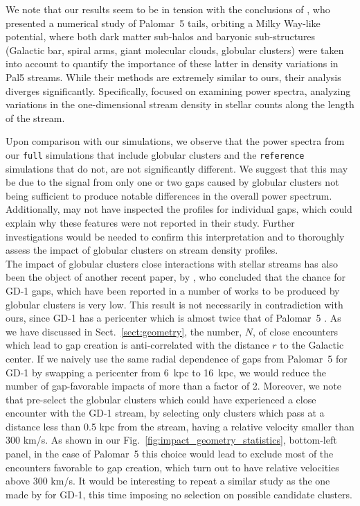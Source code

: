 \documentclass{aa}
\begin{document}
  We note that our results seem to be in tension with the conclusions of \citet{2019MNRAS.484.2009B}, who presented a numerical study of Palomar~5 tails, orbiting a Milky Way-like potential, where both dark matter sub-halos and baryonic sub-structures (Galactic bar, spiral arms, giant molecular clouds, globular clusters) were taken into account to quantify the importance of these latter in density variations in Pal5 streams. While their methods are extremely similar to ours, their analysis diverges significantly. Specifically, \citet{2019MNRAS.484.2009B} focused on examining power spectra, analyzing variations in the one-dimensional stream density in stellar counts along the length of the stream. 

  Upon comparison with our simulations, we observe that the power spectra from our \texttt{full} simulations that include globular clusters and the \texttt{reference} simulations that do not, are not significantly different. We suggest that this may be due to the signal from only one or two gaps caused by globular clusters not being sufficient to produce notable differences in the overall power spectrum. Additionally, \citet{2019MNRAS.484.2009B} may not have inspected the profiles for individual gaps, which could explain why these features were not reported in their study. Further investigations would be needed to confirm this interpretation and to thoroughly assess the impact of globular clusters on stream density profiles. \\

  The impact of globular clusters close interactions with stellar streams has also been the object of another recent paper, by \citet{2022ApJ...941..129D}, who concluded that the chance for GD-1 gaps, which have been reported in a number of works \citep[see, for example, ][]{2019ApJ...880...38B,2018MNRAS.477.1893D,2020AAS...23533607D} to be produced by globular clusters is very low. This result is not necessarily in contradiction with ours, since GD-1 has a pericenter which is almost twice that of Palomar~5 \citep[see, for example][]{2019MNRAS.486.2995M}. As we have discussed in Sect.~\ref{sect:geometry}, the number, $N$, of close encounters which lead to gap creation is anti-correlated with the distance $r$ to the Galactic center. If we naively use the same radial dependence of gaps from Palomar~5 for GD-1 by swapping a pericenter from 6~kpc to 16~kpc, we would reduce the number of gap-favorable impacts of more than a factor of 2. Moreover, we note that \citet{2022ApJ...941..129D} pre-select the globular clusters which could have experienced a close encounter with the GD-1 stream, by selecting only clusters which pass at a distance less than 0.5 kpc from the stream, having a relative velocity smaller than  300 km/s. As shown in our Fig.~\ref{fig:impact_geometry_statistics}, bottom-left panel, in the case of Palomar~5 this choice would lead to exclude most of the encounters favorable to gap creation, which turn out to have relative velocities above 300 km/s. It would be interesting to repeat a similar study as the one made by \citet{2022ApJ...941..129D} for GD-1, this time imposing no selection on possible candidate clusters.\\
  
\end{document}
